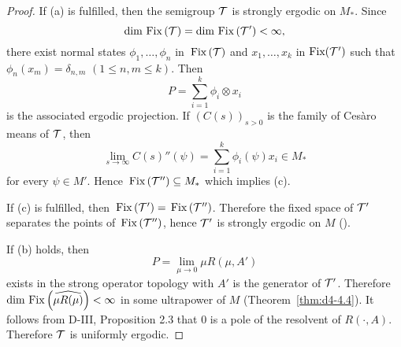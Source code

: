 \begin{proof}
If (a) is fulfilled, then the semigroup $ \mathcal{T} $  is strongly ergodic on $ M_{*} $.
Since
\[
\dim \mathop{}\mathrm{Fix}\left(\mathcal{T}\right) = \dim \mathop{}\mathrm{Fix}\left(\mathcal{T}'\right) < \infty,
\]
there exist normal states $ \phi_{1},\ldots,\phi_{n} $  in $ \mathop{}\mathrm{Fix}\left(\mathcal{T}\right) $  and $ x_{1},\ldots,x_{k} $  in $ \text{Fix}(\mathcal{T}') $  such that $ \phi_{n}(x_{m}) = \delta_{n,m} $  $ (1 \leq n, m \leq k) $.
Then 
\[
P = \sum_{i=1}^{k} \phi_{i} \otimes x_{i} 
\]
is the associated ergodic projection.
If $ (C(s))_{s>0} $  is the family of Cesàro means of $ \mathcal{T} $, then
\[
\lim_{s \to \infty} C(s)''(\psi) = \sum_{i=1}^{k} \phi_{i}(\psi)x_{i} \in M_{*}
\]
for every $ \psi \in M' $.
Hence $ \mathop{}\mathrm{Fix}\left(\mathcal{T}''\right) \subseteq M_{*} $  which implies (c).

If (c) is fulfilled, then $ \mathop{}\mathrm{Fix}\left(\mathcal{T}'\right) = \mathop{}\mathrm{Fix}\left(\mathcal{T}''\right) $.
Therefore the fixed space of $ \mathcal{T}' $  separates the points of $ \mathop{}\mathrm{Fix}\left(\mathcal{T}''\right) $, hence $ \mathcal{T}' $  is strongly ergodic on $ M $  (\citet[Chap.2, Thm.1.4]{krengel:1985}).

If (b) holds, then
\[
P = \lim_{\mu \to 0} \mu R(\mu,A')
\]
exists in the strong operator topology with $ A' $  is the generator of $ \mathcal{T}' $.
Therefore $ \dim \mathop{}\mathrm{Fix}\left(\widehat{\mu R(\mu)}\right) < \infty $  in some ultrapower of $ M $  (Theorem~\ref{thm:d4-4.4}).
It follows from D-III, Proposition 2.3 that 0 is a pole of the resolvent of $ R(\cdot,A) $.
Therefore $ \mathcal{T} $  is uniformly ergodic.
\end{proof}
